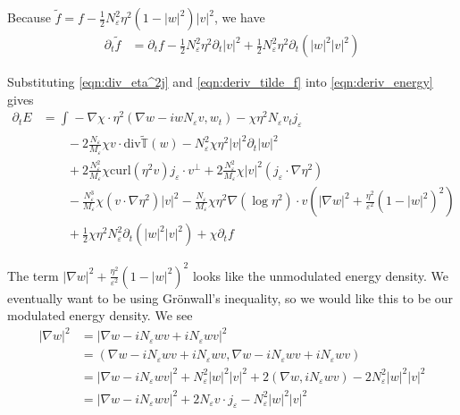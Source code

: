 \documentclass[a4paper]{article}
\newcommand{\curl}{\mathrm{curl}}
\renewcommand{\div}{\mathrm{div}}
\begin{document}
Because $\tilde{f} = f - \frac{1}{2} N_\varepsilon^2 \eta^2 (1-|w|^2)|v|^2$, we have
\begin{align}
  \partial_t \tilde{f} &= \partial_t f - \frac{1}{2} N_\varepsilon^2 \eta^2 \partial_t |v|^2 + \frac{1}{2} N_\varepsilon^2 \eta^2 \partial_t ( |w|^2
  |v|^2 )
  \label{eqn:deriv_tilde_f}
\end{align}

Substituting \eqref{eqn:div_eta^2j} and \eqref{eqn:deriv_tilde_f} into \eqref{eqn:deriv_energy} gives
\begin{align}
  \partial_t E &= \int_{}^{} -\nabla \chi \cdot \eta^2 ( \nabla w - i w N_\varepsilon v, w_t) - \chi \eta^2 N_\varepsilon v_t j_\varepsilon \nonumber
  \\
  &\quad \quad -2 \frac{N_\varepsilon}{M_\varepsilon} \chi v \cdot \div \tilde{\mathbb{T}}(w) -
  N_\varepsilon^2 \chi \eta^2 |v|^2 \partial_t |w|^2  \nonumber \\
  &\quad \quad+ 2 \frac{N_\varepsilon^2}{M_\varepsilon} \chi \curl(\eta^2 v) j_\varepsilon \cdot v^\perp + 2 \frac{N_\varepsilon^2}{M_\varepsilon} \chi
  |v|^2 (j_\varepsilon \cdot \nabla \eta^2) \nonumber \\
  &\quad \quad - \frac{N_\varepsilon^3}{M_\varepsilon} \chi (v \cdot \nabla \eta^2) |v|^2 - \frac{N_\varepsilon}{M_\varepsilon} \chi \eta^2 \nabla(
  \log \eta^2 ) \cdot v \left( | \nabla w |^2 + \frac{\eta^2}{\varepsilon^2} (1-|w|^2)^2 \right) \nonumber \\
  &\quad \quad + \frac{1}{2} \chi \eta^2 N_\varepsilon^2 \partial_t (|w|^2 |v|^2) + \chi \partial_t f
  \label{eqn:deriv_energy2}
\end{align}

The term $| \nabla w |^2 + \frac{\eta^2}{\varepsilon^2} (1-|w|^2)^2$ looks like the unmodulated energy density. We eventually want to be using
Gr\"{o}nwall's inequality, so we would like this to be our modulated energy density. We see
\begin{align}
  | \nabla w |^2 &= | \nabla w - i N_\varepsilon w v + i N_\varepsilon w v |^2 \nonumber \\
  &= ( \nabla w - i N_\varepsilon w v + i N_\varepsilon w v , \nabla w - i N_\varepsilon wv + i N_\varepsilon wv ) \nonumber \\
  &= | \nabla w - i N_\varepsilon w v |^2 + N_\varepsilon^2 |w|^2 |v|^2 + 2 ( \nabla w, i N_\varepsilon w v) - 2 N_\varepsilon^2 |w|^2 |v|^2 \nonumber
  \\
  &= | \nabla w - i N_\varepsilon w v |^2 + 2 N_\varepsilon v \cdot j_\varepsilon - N_\varepsilon^2 |w|^2 |v|^2
  \label{eqn:nabla_w}
\end{align}
\end{document}
